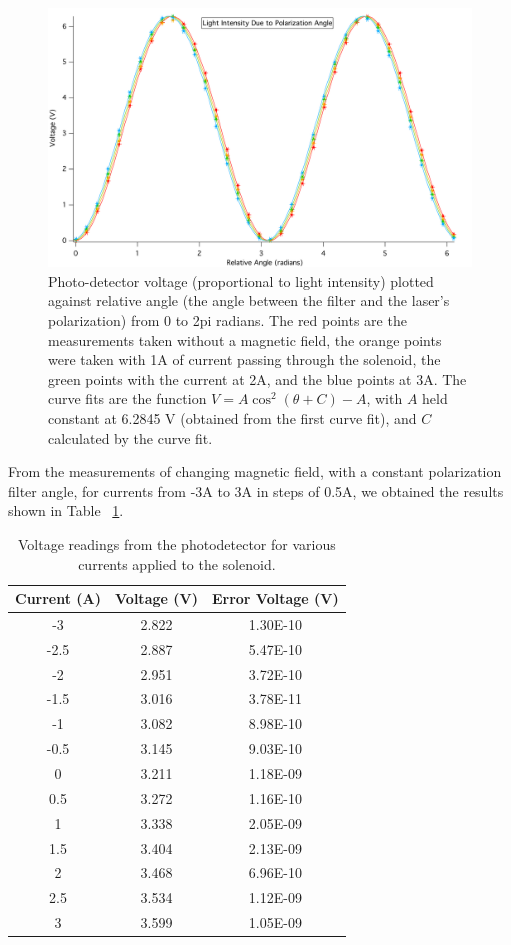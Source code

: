 \documentclass[prb,preprint]{revtex4-1}
\begin{document}
\begin{figure}[h!]
\centering
\includegraphics[width=6in]{V_ThetaRel_Plot.pdf}
\caption{Photo-detector voltage (proportional to light intensity) plotted against relative angle (the angle between the filter and the laser’s polarization) from 0 to 2pi radians.  The red points are the measurements taken without a magnetic field, the orange points were taken with 1A of current passing through the solenoid, the green points with the current at 2A, and the blue points at 3A.  The curve fits are the function $V = A \cos^{2}(\theta + C) - A$, with $A$ held constant at 6.2845 V (obtained from the first curve fit), and $C$ calculated by the curve fit. }
\label{V_ThetaRel_Plot}
\end{figure}

From the measurements of changing magnetic field, with a constant polarization filter angle, for currents from -3A to 3A in steps of 0.5A, we obtained the results shown in Table ~\ref{V_I_Table}. 

\begin{table}[h!]
\centering
\caption{Voltage readings from the photodetector for various currents applied to the solenoid. }
\begin{ruledtabular}
\begin{tabular}{c c c}
Current (A) & Voltage (V) & Error Voltage (V)\\
\hline	%
-3   & 2.822 & 1.30E-10 \\
-2.5 & 2.887 & 5.47E-10 \\
-2   & 2.951 & 3.72E-10 \\
-1.5 & 3.016 & 3.78E-11 \\
-1   & 3.082 & 8.98E-10 \\
-0.5 & 3.145 & 9.03E-10 \\
0    & 3.211 & 1.18E-09 \\
0.5  & 3.272 & 1.16E-10 \\
1    & 3.338 & 2.05E-09 \\
1.5  & 3.404 & 2.13E-09 \\
2    & 3.468 & 6.96E-10 \\
2.5  & 3.534 & 1.12E-09 \\
3    & 3.599 & 1.05E-09
\end{tabular}
\end{ruledtabular}
\label{V_I_Table}
\end{table}
\end{document}
